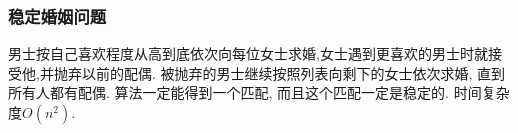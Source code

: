 \subsubsection{稳定婚姻问题}
         男士按自己喜欢程度从高到底依次向每位女士求婚,女士遇到更喜欢的男士时就接受他,并抛弃以前的配偶. 被抛弃的男士继续按照列表向剩下的女士依次求婚, 直到所有人都有配偶. 算法一定能得到一个匹配, 而且这个匹配一定是稳定的. 时间复杂度$O(n^2)$. 

\begin{comment}
\subsubsection{最大流和最小割}
	\paragraph{常见建模方法} 拆点; 黑白染色; 流量正无穷表示冲突; 缩点; 数据结构优化建图; 最小割：每个变元拉一条$S$到$T$的链, 割在哪里表示取值, 相互连边表示依赖关系; 先把收益拿下, 在考虑冲突与代价的影响. 

\end{comment}
